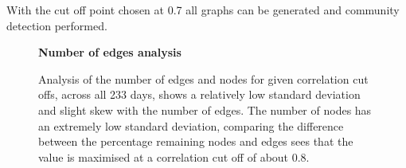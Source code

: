 With the cut off point chosen at 0.7 all graphs can be generated and community detection performed.

\begin{figure}[ht]
\centering
\textbf{Number of edges analysis}\par\medskip
{}

\caption[Number of edges analysis]{Analysis of the number of edges and nodes for given correlation cut offs, across all 233 days, shows a relatively low standard deviation and slight skew with the number of edges. The number of nodes has an extremely low standard deviation, comparing the difference between the percentage remaining nodes and edges sees that the value is maximised at a correlation cut off of about 0.8. }
\label{fig:EdgeNodeAnalysis}
\end{figure}



